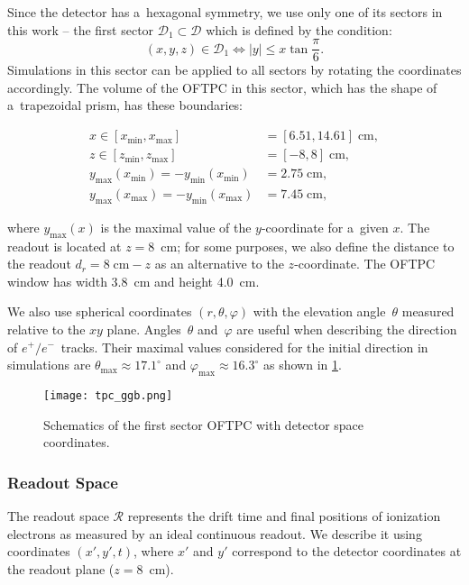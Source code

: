 				Since the detector has a~hexagonal symmetry, we use only one of its sectors in this work -- the first sector $\mathcal{D}_1 \subset \mathcal{D}$ which is defined by the condition:
					\begin{equation}
						(x,y,z) \in \mathcal{D}_1 \Leftrightarrow |y| \leq x\tan \frac{\pi}{6}.
					\end{equation}
				Simulations in this sector can be applied to all sectors by rotating the coordinates accordingly. The volume of the \ac{OFTPC} in this sector, which has the shape of a~trapezoidal prism, has these boundaries:
					\begin{linenomath}
						\begin{align}
							x \in [x_\text{min},x_\text{max}] &= [6.51, 14.61] \;\text{cm},\\
							z \in [z_\text{min},z_\text{max}] &= [-8,8] \;\text{cm},\\
							y_\text{max}(x_\text{min}) = -y_\text{min}(x_\text{min}) &=  2.75\;\text{cm},\\
							y_\text{max}(x_\text{max}) = -y_\text{min}(x_\text{max}) &=  7.45\;\text{cm},
						\end{align}
					\end{linenomath}
				where $y_\text{max}(x)$ is the maximal value of the $y$-coordinate for a~given $x$. The readout is located at $z = 8$~cm; for some purposes, we also define the distance to the readout $d_r = 8\;\text{cm}-z$ as an alternative to the $z$-coordinate. The \ac{OFTPC} window has width 3.8~cm and height 4.0~cm.
				
				We also use spherical coordinates $(r,\theta,\varphi)$ with the elevation angle~$\theta$ measured relative to the $xy$ plane. Angles~$\theta$ and~$\varphi$ are useful when describing the direction of $e^+/e^-$~tracks. Their maximal values considered for the initial direction in simulations are $\theta_\text{max} \approx 17.1^\circ$ and $\varphi_\text{max} \approx 16.3^\circ$ as shown in \cref{fig:oftpc}.
				
				\begin{figure}
					\centering
					\texttt{[image: tpc\_ggb.png]}
					\caption{Schematics of the first sector \ac{OFTPC} with detector space coordinates.}
					\label{fig:oftpc}
				\end{figure}
			
			\subsubsection{Readout Space}
				The readout space $\mathcal{R}$ represents the drift time and final positions of ionization electrons as measured by an ideal continuous readout. We describe it using coordinates $(x',y',t)$, where $x'$ and $y'$ correspond to the detector coordinates at the readout plane ($z = 8$~cm).
				
